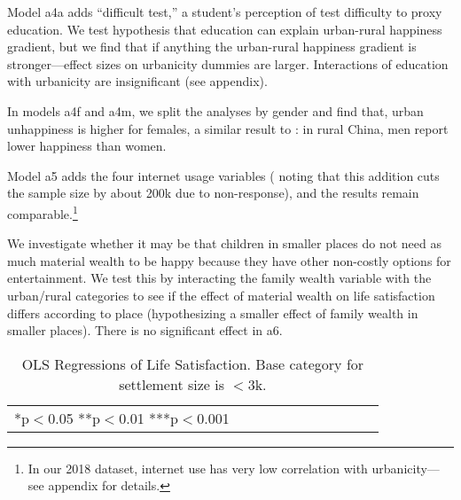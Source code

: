 \documentclass[10pt, letterpaper]{article}
\begin{document}
\begin{spacing}{1.4}
Model a4a adds ``difficult test,'' a student's perception of test difficulty to
proxy education. We test \citet{morrison2024resolving} hypothesis that education can explain
urban-rural happiness gradient, but we find that if anything the urban-rural
happiness gradient is stronger---effect sizes on urbanicity dummies are
larger. Interactions of education with urbanicity are insignificant (see  appendix).

In models a4f and a4m, we split the analyses by gender and find that, urban unhappiness is higher for
females, a similar result to \citet{knight2010rural}: in rural China, men report lower happiness than women.

Model a5  adds the four internet usage variables  (%
noting that this addition cuts the sample size by about 200k due to non-response),
and the results remain comparable.\footnote{In our 2018 dataset, internet use has very low correlation with urbanicity---see appendix for details.} %

We investigate whether it may be that children in smaller places do not need as
much material wealth to be happy because they have other non-costly options for
entertainment. We test this by interacting the family wealth variable with the
urban/rural categories to see if the effect of material wealth on life
satisfaction differs according to place (hypothesizing a smaller effect of
family wealth in smaller places).
There is no significant effect in a6. 

\begin{table}[H]\centering\caption{OLS Regressions of Life Satisfaction. Base category for settlement size is $<$3k.} \label{regA} \begin{scriptsize} \begin{tabular}{p{1.6in}p{.5in}p{.5in}p{.5in}p{.5in}p{.5in}|p{.5in}p{.5in}|p{.5in}|p{.5in}p{.5in}p{.5 in}p{.5in}p{.5 in}}\hline  \hline\multicolumn{4}{l}{*p$<$0.05 **p$<$0.01 ***p$<$0.001} \end{tabular}\end{scriptsize}\end{table}




\end{spacing}
\end{document}
